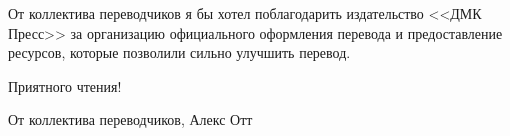 От коллектива переводчиков я бы хотел поблагодарить издательство <<ДМК Пресс>> за
организацию официального оформления перевода и предоставление ресурсов, которые позволили
сильно улучшить перевод.

\vspace{1em}

Приятного чтения!

\begin{flushright}
  От коллектива переводчиков, Алекс Отт
\end{flushright}

